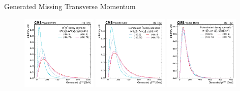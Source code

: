 \begin{frame}[fragile]{Generated Missing Transverse Momentum} 
  \begin{figure}[htpb]
    \centering
    \includegraphics[width=0.32\textwidth]{fig/sig/Sig_wz_GenMetPt.pdf}
    \includegraphics[width=0.32\textwidth]{fig/sig/Sig_democratic_GenMetPt.pdf}
    \includegraphics[width=0.32\textwidth]{fig/sig/Sig_stau_GenMetPt.pdf}
  \end{figure}	
\end{frame}

